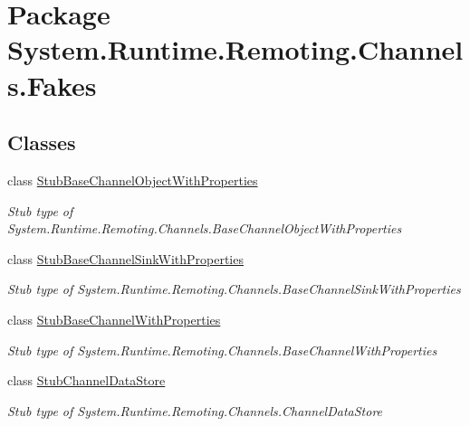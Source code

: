 \hypertarget{namespace_system_1_1_runtime_1_1_remoting_1_1_channels_1_1_fakes}{\section{Package System.\-Runtime.\-Remoting.\-Channels.\-Fakes}
\label{namespace_system_1_1_runtime_1_1_remoting_1_1_channels_1_1_fakes}
}
\subsection*{Classes}
\begin{DoxyCompactItemize}
\item 
class \hyperlink{class_system_1_1_runtime_1_1_remoting_1_1_channels_1_1_fakes_1_1_stub_base_channel_object_with_properties}{Stub\-Base\-Channel\-Object\-With\-Properties}
\begin{DoxyCompactList}\small\item\em Stub type of System.\-Runtime.\-Remoting.\-Channels.\-Base\-Channel\-Object\-With\-Properties\end{DoxyCompactList}\item 
class \hyperlink{class_system_1_1_runtime_1_1_remoting_1_1_channels_1_1_fakes_1_1_stub_base_channel_sink_with_properties}{Stub\-Base\-Channel\-Sink\-With\-Properties}
\begin{DoxyCompactList}\small\item\em Stub type of System.\-Runtime.\-Remoting.\-Channels.\-Base\-Channel\-Sink\-With\-Properties\end{DoxyCompactList}\item 
class \hyperlink{class_system_1_1_runtime_1_1_remoting_1_1_channels_1_1_fakes_1_1_stub_base_channel_with_properties}{Stub\-Base\-Channel\-With\-Properties}
\begin{DoxyCompactList}\small\item\em Stub type of System.\-Runtime.\-Remoting.\-Channels.\-Base\-Channel\-With\-Properties\end{DoxyCompactList}\item 
class \hyperlink{class_system_1_1_runtime_1_1_remoting_1_1_channels_1_1_fakes_1_1_stub_channel_data_store}{Stub\-Channel\-Data\-Store}
\begin{DoxyCompactList}\small\item\em Stub type of System.\-Runtime.\-Remoting.\-Channels.\-Channel\-Data\-Store\end{DoxyCompactList}\item 

\end{DoxyCompactItemize}
